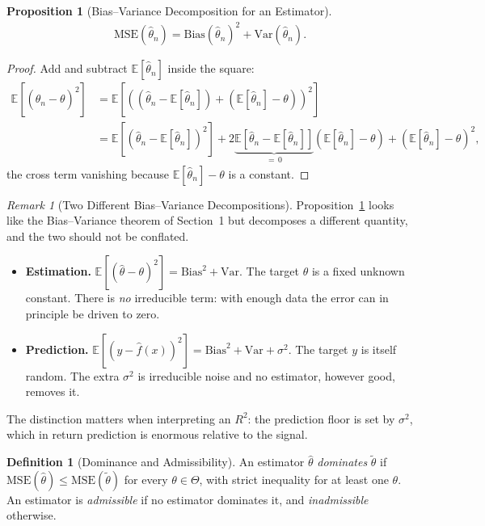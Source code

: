 \documentclass[11pt]{article}
\theoremstyle{definition}
\newtheorem{definition}{Definition}[section]
\theoremstyle{plain}
\newtheorem{proposition}{Proposition}[section]
\theoremstyle{remark}
\newtheorem{remark}{Remark}[section]
\begin{document}
\begin{proposition}[Bias--Variance Decomposition for an Estimator]\label{prop:mse-est}
    \begin{align}
        \mathrm{MSE}(\hat{\theta}_n) = \mathrm{Bias}(\hat{\theta}_n)^2 + \mathrm{Var}(\hat{\theta}_n).
    \end{align}
\end{proposition}
\begin{proof}
    Add and subtract $\mathbb{E}[\hat{\theta}_n]$ inside the square:
    \begin{align}
        \mathbb{E}\!\left[(\hat{\theta}_n - \theta)^2\right]
        &= \mathbb{E}\!\left[\left((\hat{\theta}_n - \mathbb{E}[\hat{\theta}_n]) + (\mathbb{E}[\hat{\theta}_n] - \theta)\right)^2\right] \\
        &= \mathbb{E}\!\left[(\hat{\theta}_n - \mathbb{E}[\hat{\theta}_n])^2\right] + 2\underbrace{\mathbb{E}\!\left[\hat{\theta}_n - \mathbb{E}[\hat{\theta}_n]\right]}_{=\,0}\left(\mathbb{E}[\hat{\theta}_n]-\theta\right) + \left(\mathbb{E}[\hat{\theta}_n]-\theta\right)^2,
    \end{align}
    the cross term vanishing because $\mathbb{E}[\hat{\theta}_n] - \theta$ is a constant.
\end{proof}

\begin{remark}[Two Different Bias--Variance Decompositions]
    Proposition~\ref{prop:mse-est} looks like the Bias--Variance theorem of Section~1 but decomposes a different quantity, and the two should not be conflated.
    \begin{itemize}[noitemsep]
        \item \textbf{Estimation.} $\mathbb{E}[(\hat{\theta}-\theta)^2] = \mathrm{Bias}^2 + \mathrm{Var}$. The target $\theta$ is a fixed unknown constant. There is \emph{no} irreducible term: with enough data the error can in principle be driven to zero.
        \item \textbf{Prediction.} $\mathbb{E}[(y - \hat{f}(x))^2] = \mathrm{Bias}^2 + \mathrm{Var} + \sigma^2$. The target $y$ is itself random. The extra $\sigma^2$ is irreducible noise and no estimator, however good, removes it.
    \end{itemize}
    The distinction matters when interpreting an $R^2$: the prediction floor is set by $\sigma^2$, which in return prediction is enormous relative to the signal.
\end{remark}

\begin{definition}[Dominance and Admissibility]
    An estimator $\hat{\theta}$ \emph{dominates} $\tilde{\theta}$ if $\mathrm{MSE}(\hat{\theta}) \leq \mathrm{MSE}(\tilde{\theta})$ for every $\theta \in \Theta$, with strict inequality for at least one $\theta$. An estimator is \emph{admissible} if no estimator dominates it, and \emph{inadmissible} otherwise.
\end{definition}
\end{document}
